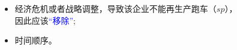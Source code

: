 \documentclass[aspectratio=1610, 9pt, CJK]{beamer}
\begin{document}
\begin{frame}
\begin{example}[汽车制造企业模型]
\begin{columns}
\begin{figure}
	\end{figure} 
			\pause
			\begin{itemize} 
				\item 经济危机或者战略调整，导致该企业不能再生产跑车（$sp$），因此应该\textcolor{blue}{“移除”};
				\item 时间顺序。
			\end{itemize} 
		\end{columns} 
	\end{example}
\end{frame}
	
\end{document}
